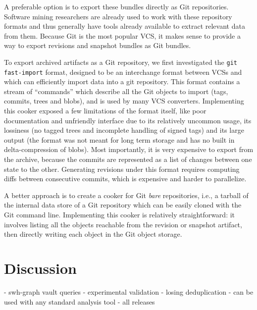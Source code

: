 A preferable option is to export these bundles directly as Git repositories.
Software mining researchers are already used to work with these repository
formats and thus generally have tools already available to extract relevant
data from them. Because Git is the most popular \gls{VCS}, it makes sense to
provide a way to export revisions and snapshot bundles as Git bundles.

To export archived artifacts as a Git repository, we first investigated the
\texttt{git fast-import} format, designed to be an interchange format between
\glspl{VCS} and which can efficiently import data into a git repository. This
format contains a stream of ``commands'' which describe all the Git objects to
import (tags, commits, trees and blobs), and is used by many \gls{VCS}
converters. Implementing this cooker exposed a few limitations of the format
itself, like poor documentation and unfriendly interface due to its relatively
uncommon usage, its lossiness (no tagged trees and incomplete handling of
signed tags) and its large output (the format was not meant for long term
storage and has no built in delta-compression of blobs).
Most importantly, it is very expensive to export from the archive, because the
commits are represented as a list of changes between one state to the other.
Generating revisions under this format requires computing diffs between
consecutive commits, which is expensive and harder to parallelize.

A better approach is to create a cooker for Git \emph{bare} repositories, i.e.,
a tarball of the internal data store of a Git repository which can be easily
cloned with the Git command line. Implementing this cooker is relatively
straightforward: it involves listing all the objects reachable from the
revision or snapshot artifact, then directly writing each object in the Git
object storage.

\section{Discussion}

- swh-graph vault queries
- experimental validation
- losing deduplication
- can be used with any standard analysis tool
- all releases
